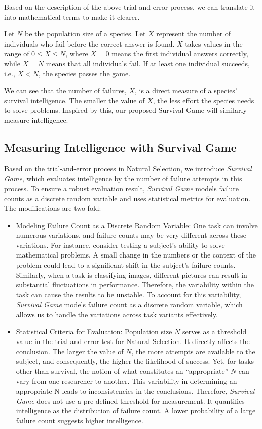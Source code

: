 Based on the description of the above trial-and-error process, we can translate it into mathematical terms to make it clearer.

\begin{definition}
Let $N$ be the population size of a species. Let \( X \) represent the number of individuals who fail before the correct answer is found. \( X \) takes values in the range of $0 \leq X \leq N$, where $X=0$ means the first individual answers correctly, while $X=N$ means that all individuals fail. If at least one individual succeeds, i.e., \( X < N \), the species passes the game.
\end{definition}

We can see that the number of failures, $X$, is a direct measure of a species' survival intelligence. The smaller the value of $X$, the less effort the species needs to solve problems. Inspired by this, our proposed Survival Game will similarly measure intelligence.


\subsection{Measuring Intelligence with Survival Game}

Based on the trial-and-error process in Natural Selection, we introduce \textit{Survival Game}, which evaluates intelligence by the number of failure attempts in this process. To ensure a robust evaluation result, \textit{Survival Game} models failure counts as a discrete random variable and uses statistical metrics for evaluation. The modifications are two-fold:
\begin{itemize}
	\item Modeling Failure Count as a Discrete Random Variable: One task can involve numerous variations, and failure counts may be very different across these variations. For instance, consider testing a subject's ability to solve mathematical problems. A small change in the numbers or the context of the problem could lead to a significant shift in the subject’s failure counts. Similarly, when a task is classifying images, different pictures can result in substantial fluctuations in performance. Therefore, the variability within the task can cause the results to be unstable. To account for this variability, \textit{Survival Game} models failure count as a discrete random variable, which allows us to handle the variations across task variants effectively.
	\item Statistical Criteria for Evaluation: Population size $N$ serves as a threshold value in the trial-and-error test for Natural Selection. It directly affects the conclusion. The larger the value of $N$, the more attempts are available to the subject, and consequently, the higher the likelihood of success. Yet, for tasks other than survival, the notion of what constitutes an ``appropriate'' $N$ can vary from one researcher to another. This variability in determining an appropriate N leads to inconsistencies in the conclusions. Therefore, \textit{Survival Game} does not use a pre-defined threshold for measurement. It quantifies intelligence as the distribution of failure count. A lower probability of a large failure count suggests higher intelligence. 
\end{itemize}


